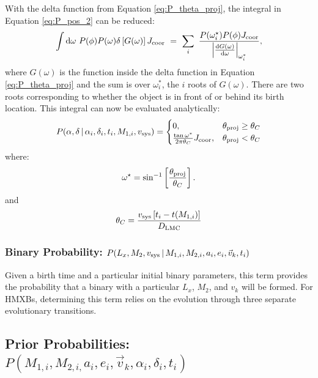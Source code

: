 \documentclass[12pt, preprint]{aastex}
\newcommand{\given}{\,|\,}
\newcommand{\dd}{\mathrm{d}}
\begin{document}
With the delta function from Equation \ref{eq:P_theta_proj}, the integral in Equation \ref{eq:P_pos_2} can be reduced:
\begin{equation}
\int \dd \omega\ P(\phi) P(\omega) \delta \left[ G(\omega) \right]  J_{\rm coor}\  =\ \sum_i\ \frac{P(\omega_i^{\star}) P(\phi)  J_{\rm coor}}{ \left| \frac{ \dd G (\omega) }{\dd \omega} \right|_{\omega_i^*}},
\end{equation}
where $G(\omega)$ is the function inside the delta function in Equation \ref{eq:P_theta_proj} and the sum is over $\omega_i^*$, the $i$ roots of $G(\omega)$. There are two roots corresponding to whether the object is in front of or behind its birth location. This integral can now be evaluated analytically:
\begin{equation}
P(\alpha, \delta \given \alpha_i, \delta_i, t_i, M_{1,i}, v_{\rm sys} ) =
\begin{cases} 
      0, & \theta_{\rm proj} \geq \theta_C\\
     \frac{\tan \omega^*}{2 \pi \theta_C}  J_{\rm coor}, & \theta_{\rm proj} < \theta_C 
   \end{cases}
\end{equation}
where:
\begin{equation}
\omega^{\star} = \sin^{-1} \left[ \frac{\theta_{\rm proj}}{\theta_C} \right].
\end{equation}
and
\begin{equation}
\theta_C = \frac{v_{\rm sys} \left[ t_i - t(M_{1,i}) \right]}{D_{\rm LMC}} \label{eq:theta_c}
\end{equation}


\subsubsection{Binary Probability: $P(L_x, M_2, v_{\rm sys} \given M_{1,i}, M_{2,i}, a_i, e_i, \vec{v}_k, t_i)$}

Given a birth time and a particular initial binary parameters, this term provides the probability that a binary with a particular $L_x$, $M_2$, and $v_k$ will be formed. For HMXBs, determining this term relies on the evolution through three separate evolutionary transitions. 



\subsection{Prior Probabilities: $P(M_{1,i}, M_{2,i,} a_i, e_i, \vec{v}_k, \alpha_i, \delta_i, t_i)$} \label{sec:priors}
\end{document}
